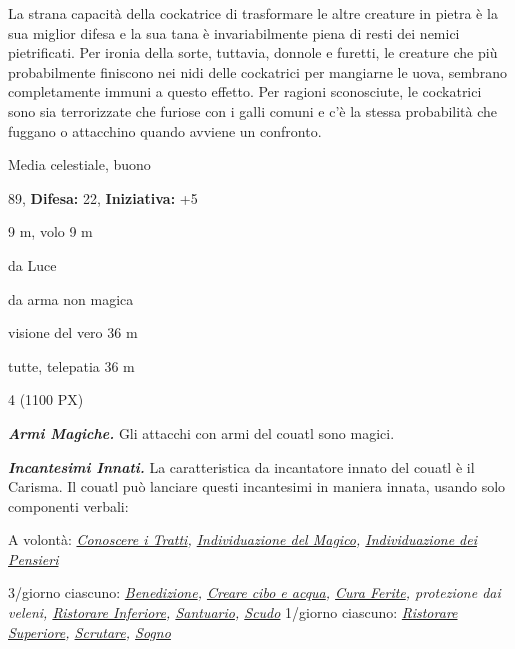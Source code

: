 \begin{multicols}{2}
{La strana capacità della cockatrice di trasformare le altre creature in pietra è la sua miglior difesa e la sua tana è invariabilmente piena di resti dei nemici pietrificati. Per ironia della sorte, tuttavia, donnole e furetti, le creature che più probabilmente finiscono nei nidi delle cockatrici per mangiarne le uova, sembrano completamente immuni a questo effetto. Per ragioni sconosciute, le cockatrici sono sia terrorizzate che furiose con i galli comuni e c'è la stessa probabilità che fuggano o attacchino quando avviene un confronto.

\noindent
\begin{description}[noitemsep, topsep=0pt, parsep=0pt, partopsep=0pt, leftmargin=0cm, labelwidth=2.2cm]
	\item[\textbf{Taglia/Tipo:}] Media celestiale, buono
	\item[\textbf{Caratt.:}] 
	\item[\textbf{Punti Ferita:}] 89,  \textbf{Difesa:} 22,  \textbf{Iniziativa:} +5
	\item[\textbf{Movimento:}] 9 m, volo 9 m
	\item[\textbf{Tiri Salvez.:}] 
	\item[\textbf{Res. Danni:}] da Luce
	\item[\textbf{Imm. Danni:}] da arma non magica
	\item[\textbf{Sensi:}] visione del vero 36 m
	\item[\textbf{Linguaggi:}] tutte, telepatia 36 m
	\item[\textbf{Sfida:}] 4 (1100 PX)\smallskip
\end{description}

\emph{\textbf{Armi Magiche.}} Gli attacchi con armi del couatl sono magici.

\emph{\textbf{Incantesimi Innati.}} La caratteristica da incantatore innato del couatl è il Carisma. Il couatl può lanciare questi incantesimi in maniera innata, usando solo componenti verbali:

A volontà: \emph{\hyperlink{Conoscere i Tratti}{Conoscere i Tratti}, \hyperlink{Individuazione del Magico}{Individuazione del Magico}, \hyperlink{Individuazione dei Pensieri}{Individuazione dei Pensieri}}

3/giorno ciascuno: \emph{\hyperlink{Benedizione}{Benedizione}, \hyperlink{Creare cibo e acqua}{Creare cibo e acqua}, \hyperlink{Cura Ferite}{Cura Ferite}, protezione dai veleni, \hyperlink{Ristorare Inferiore}{Ristorare Inferiore}, \hyperlink{Santuario}{Santuario}, \hyperlink{Scudo}{Scudo}} 1/giorno ciascuno: \emph{\hyperlink{Ristorare Superiore}{Ristorare Superiore}, \hyperlink{Scrutare}{Scrutare}, \hyperlink{Sogno}{Sogno}}

}
\end{multicols}
